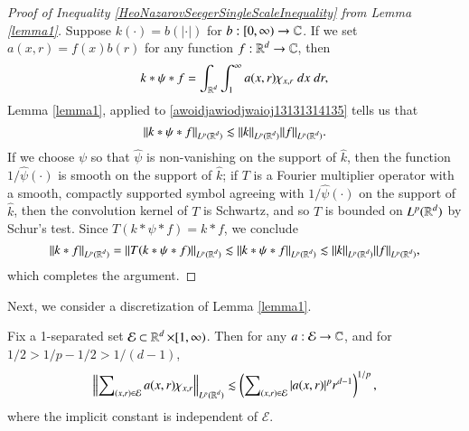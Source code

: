 \begin{proof}[Proof of Inequality \eqref{HeoNazarovSeegerSingleScaleInequality} from Lemma \ref{lemma1}] Suppose $k(\cdot) = b(|\cdot|)$ for $b: [0,\infty) \to \operatorname{\mathbb{C}}$. If we set $a(x,r) = f(x) b(r)$ for any function $f: \operatorname{\mathbb{R}}^d \to \operatorname{\mathbb{C}}$, then
%
\begin{equation} \label{awoidjawiodjwaioj13131314135}
  k * \psi * f = \int_{\operatorname{\mathbb{R}}^d} \int_1^\infty a(x,r) \chi_{x, r}\; dx\; dr,
\end{equation}
%
Lemma \ref{lemma1}, applied to \eqref{awoidjawiodjwaioj13131314135} tells us that
%
\begin{equation}
  \| k * \psi * f \|_{L^p(\operatorname{\mathbb{R}}^d)} \lesssim \| k \|_{L^p(\operatorname{\mathbb{R}}^d)} \| f \|_{L^p(\operatorname{\mathbb{R}}^d)}.
\end{equation}
%
If we choose $\psi$ so that $\widehat{\psi}$ is non-vanishing on the support of $\widehat{k}$, then the function $1/\widehat{\psi}(\cdot)$ is smooth on the support of $\widehat{k}$; if $T$ is a Fourier multiplier operator with a smooth, compactly supported symbol agreeing with $1/\widehat{\psi}(\cdot)$ on the support of $\widehat{k}$, then the convolution kernel of $T$ is Schwartz, and so $T$ is bounded on $L^p(\operatorname{\mathbb{R}}^d)$ by Schur's test. Since $T(k * \psi * f) = k * f$, we conclude
%
\begin{equation}
  \| k * f \|_{L^p(\operatorname{\mathbb{R}}^d)} = \| T(k * \psi * f) \|_{L^p(\operatorname{\mathbb{R}}^d)} \lesssim \| k * \psi * f \|_{L^p(\operatorname{\mathbb{R}}^d)} \lesssim \| k \|_{L^p(\operatorname{\mathbb{R}}^d)} \| f \|_{L^p(\operatorname{\mathbb{R}}^d)},
\end{equation}
%
which completes the argument.
\end{proof}

Next, we consider a discretization of Lemma \ref{lemma1}.

\begin{lemma} \label{lemma2}
    Fix a 1-separated set $\mathcal{E} \subset \operatorname{\mathbb{R}}^d \times [1,\infty)$. Then for any $a: \mathcal{E} \to \operatorname{\mathbb{C}}$, and for $1/2 > 1/p - 1/2 > 1/(d-1)$,
    \[ \left\| \sum\nolimits_{(x,r) \in \mathcal{E}} a(x,r) \chi_{x, r} \right\|_{L^p(\operatorname{\mathbb{R}}^d)} \lesssim \left( \sum\nolimits_{(x,r) \in \mathcal{E}} |a(x,r)|^p r^{d-1} \right)^{1/p}, \]
    where the implicit constant is independent of $\mathcal{E}$.
\end{lemma}


